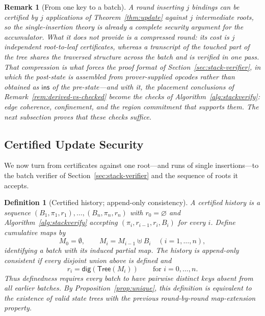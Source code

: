 \documentclass[11pt]{article}
\newtheorem{definition}{Definition}
\newtheorem{remark}{Remark}
\begin{document}
\begin{remark}[From one key to a batch]
\label{rem:single-key-border}
A round inserting $j$ bindings can be certified by $j$ applications of Theorem~\ref{thm:update} against $j$ intermediate roots, so the single-insertion theory is already a complete security argument for the accumulator. What it does not provide is a \emph{compressed} round: its cost is $j$ independent root-to-leaf certificates, whereas a transcript of the touched part of the tree shares the traversed structure across the batch and is verified in one pass. That compression is what forces the proof format of Section~\ref{sec:stack-verifier}, in which the post-state is assembled from prover-supplied opcodes rather than obtained as $\mathsf{ins}$ of the pre-state---and with it, the placement conclusions of Remark~\ref{rem:derived-vs-checked} become the checks of Algorithm~\ref{alg:stackverify}: edge coherence, confinement, and the region commitment that supports them. The next subsection proves that these checks suffice.
\end{remark}

\subsection{Certified Update Security}
\label{sec:consistency-theorem}

We now turn from certificates against one root---and runs of single insertions---to the batch verifier of Section~\ref{sec:stack-verifier} and the sequence of roots it accepts.

\begin{definition}[Certified history; append-only consistency]
\label{def:aoc}
A \emph{certified history} is a sequence $(B_1, \pi_1, r_1), \allowbreak \ldots, \allowbreak (B_n, \pi_n, r_n)$ with $r_0 = \varnothing$ and Algorithm~\ref{alg:stackverify} accepting $(\pi_i, r_{i-1}, r_i, B_i)$ for every $i$. Define cumulative maps by
\[
  M_0 = \emptyset, \qquad M_i = M_{i-1} \uplus B_i \quad (i=1,\ldots,n),
\]
identifying a batch with its induced partial map. The history is \emph{append-only consistent} if every disjoint union above is defined and
\[
  r_i = \mathsf{dig}(\mathsf{Tree}(M_i)) \qquad \text{for } i=0,\ldots,n.
\]
Thus definedness requires every batch to have pairwise distinct keys absent from all earlier batches. By Proposition~\ref{prop:unique}, this definition is equivalent to the existence of valid state trees with the previous round-by-round map-extension property.
\end{definition}
\end{document}
